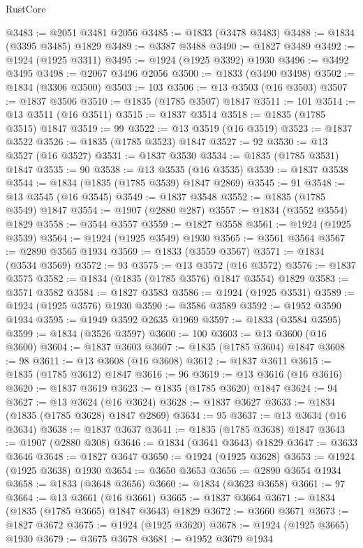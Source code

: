 \begin{lexlean}{RustCore}
\begin{coremodule}
@3483 := @2051 @3481 @2056
@3485 := @1833 (@3478 @3483)
@3488 := @1834 (@3395 @3485) @1829
@3489 := @3387 @3488
@3490 := @1827 @3489
@3492 := @1924 (@1925 @3311)
@3495 := @1924 (@1925 @3392) @1930
@3496 := @3492 @3495
@3498 := @2067 @3496 @2056
@3500 := @1833 (@3490 @3498)
@3502 := @1834 (@3306 @3500)
@3503 := 103
@3506 := @13 @3503 (@16 @3503)
@3507 := @1837 @3506
@3510 := @1835 (@1785 @3507) @1847
@3511 := 101
@3514 := @13 @3511 (@16 @3511)
@3515 := @1837 @3514
@3518 := @1835 (@1785 @3515) @1847
@3519 := 99
@3522 := @13 @3519 (@16 @3519)
@3523 := @1837 @3522
@3526 := @1835 (@1785 @3523) @1847
@3527 := 92
@3530 := @13 @3527 (@16 @3527)
@3531 := @1837 @3530
@3534 := @1835 (@1785 @3531) @1847
@3535 := 90
@3538 := @13 @3535 (@16 @3535)
@3539 := @1837 @3538
@3544 := @1834 (@1835 (@1785 @3539) @1847 @2869)
@3545 := 91
@3548 := @13 @3545 (@16 @3545)
@3549 := @1837 @3548
@3552 := @1835 (@1785 @3549) @1847
@3554 := @1907 (@2880 @287)
@3557 := @1834 (@3552 @3554) @1829
@3558 := @3544 @3557
@3559 := @1827 @3558
@3561 := @1924 (@1925 @3539)
@3564 := @1924 (@1925 @3549) @1930
@3565 := @3561 @3564
@3567 := @2890 @3565 @1934
@3569 := @1833 (@3559 @3567)
@3571 := @1834 (@3534 @3569)
@3572 := 93
@3575 := @13 @3572 (@16 @3572)
@3576 := @1837 @3575
@3582 := @1834 (@1835 (@1785 @3576) @1847 @3554) @1829
@3583 := @3571 @3582
@3584 := @1827 @3583
@3586 := @1924 (@1925 @3531)
@3589 := @1924 (@1925 @3576) @1930
@3590 := @3586 @3589
@3592 := @1952 @3590 @1934
@3595 := @1949 @3592 @2635 @1969
@3597 := @1833 (@3584 @3595)
@3599 := @1834 (@3526 @3597)
@3600 := 100
@3603 := @13 @3600 (@16 @3600)
@3604 := @1837 @3603
@3607 := @1835 (@1785 @3604) @1847
@3608 := 98
@3611 := @13 @3608 (@16 @3608)
@3612 := @1837 @3611
@3615 := @1835 (@1785 @3612) @1847
@3616 := 96
@3619 := @13 @3616 (@16 @3616)
@3620 := @1837 @3619
@3623 := @1835 (@1785 @3620) @1847
@3624 := 94
@3627 := @13 @3624 (@16 @3624)
@3628 := @1837 @3627
@3633 := @1834 (@1835 (@1785 @3628) @1847 @2869)
@3634 := 95
@3637 := @13 @3634 (@16 @3634)
@3638 := @1837 @3637
@3641 := @1835 (@1785 @3638) @1847
@3643 := @1907 (@2880 @308)
@3646 := @1834 (@3641 @3643) @1829
@3647 := @3633 @3646
@3648 := @1827 @3647
@3650 := @1924 (@1925 @3628)
@3653 := @1924 (@1925 @3638) @1930
@3654 := @3650 @3653
@3656 := @2890 @3654 @1934
@3658 := @1833 (@3648 @3656)
@3660 := @1834 (@3623 @3658)
@3661 := 97
@3664 := @13 @3661 (@16 @3661)
@3665 := @1837 @3664
@3671 := @1834 (@1835 (@1785 @3665) @1847 @3643) @1829
@3672 := @3660 @3671
@3673 := @1827 @3672
@3675 := @1924 (@1925 @3620)
@3678 := @1924 (@1925 @3665) @1930
@3679 := @3675 @3678
@3681 := @1952 @3679 @1934

\end{coremodule}
\end{lexlean}
